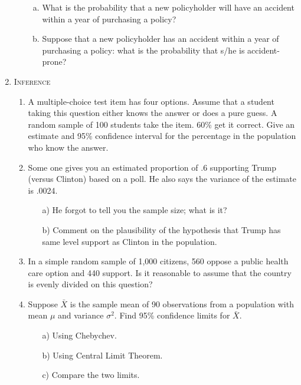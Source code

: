 \documentclass[11pt,letterpaper]{article}
\numberwithin{equation}{section}
\begin{document}
\begin{enumerate}[I]
\begin{enumerate}[1)]
\begin{enumerate}[a)]
\item What is the probability that a new policyholder will have an accident within a year of purchasing a policy?
\item  Suppose that a new policyholder has an accident within a year of purchasing a policy: what is the probability that s/he is accident-prone?
\end{enumerate}

\end{enumerate}
\item \textsc{Inference} 
\begin{enumerate}

\item A multiple-choice test item has four options. Assume that a student taking this question either knows the answer or does a pure guess. A random sample of 100 students take the item. 60\% get it correct. Give an estimate and 95\% confidence interval for the percentage in the population who know the answer.



\item Some one gives you an estimated proportion of $.6$ supporting Trump (versus Clinton) based on a poll. He also says the variance of the estimate is .0024.
\begin{enumerate}
\item[a)]  He forgot to tell you the sample size; what is it?
\item[b)] Comment on the plausibility of the hypothesis that Trump has same level support as Clinton in the population.
\end{enumerate}
\item  In a simple random sample of 1,000 citizens, 560 oppose a public health care option and 440 support. Is it reasonable to assume that the country is evenly divided on this question?


\item Suppose $\bar{X}$ is the sample mean of 90 observations from a population with mean $\mu$ and variance $\sigma^2$.  Find 95\% confidence limits for $\bar{X}$.
\begin{enumerate}
\item[a)] Using Chebychev.
\item[b)] Using Central Limit Theorem.
\item[c)] Compare the two limits.
\end{enumerate}

\end{enumerate}
\end{enumerate}
\end{document}
